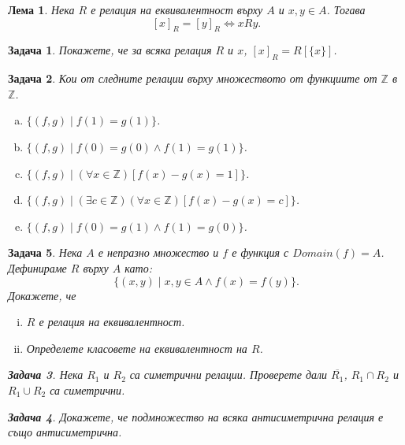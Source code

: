 \documentclass[a4paper]{article}
\newtheorem{lemma}{Лема}
\newtheorem{problem}{Задача}
\newcommand{\Z}{\mathbb{Z}}
\begin{document}
\begin{lemma}
  Нека $R$ е релация на еквивалентност върху $A$ и $x,y\in A$. Тогава \[[x]_R = [y]_R \iff xRy.\]
\end{lemma}


\begin{problem}
  Покажете, че за всяка релация $R$ и $x$, $[x]_R = R[\{x\}]$.
\end{problem}

\begin{problem}
  Кои от следните релации върху множеството от функциите от $\Z$ в $\Z$.
  \begin{enumerate}[a)]
  \item
    $\{(f,g)\mid f(1) = g(1)\}$.
  \item
    $\{(f,g)\mid f(0) = g(0)\wedge f(1) = g(1)\}$.
  \item
    $\{(f,g)\mid (\forall x\in\Z)[f(x)-g(x) = 1]\}$.
  \item
    $\{(f,g)\mid (\exists c\in\Z)(\forall x\in\Z)[f(x)-g(x) = c]\}$.
  \item
    $\{(f,g)\mid f(0) = g(1)\wedge f(1) = g(0)\}$.
  \end{enumerate}
\end{problem}


\begin{problem}
  Нека $A$ е непразно множество и $f$ е функция с $Domain(f) = A$.
  Дефинираме $R$ върху $A$ като:
  \[\{(x,y)\mid x,y\in A\wedge f(x) = f(y)\}.\]
  Докажете, че
  \begin{enumerate}[(i)]
  \item
    $R$ е релация на еквивалентност.
  \item
    Определете класовете на еквивалентност на $R$.
\end{enumerate}

\begin{problem}
  Нека $R_1$ и $R_2$ са симетрични релации.
  Проверете дали $\overline{R_1}$, $R_1\cap R_2$ и $R_1 \cup R_2$ са симетрични.
\end{problem}

\begin{problem}
  Докажете, че подмножество на всяка антисиметрична релация е също антисиметрична.
\end{problem}

\end{problem}
\end{document}
